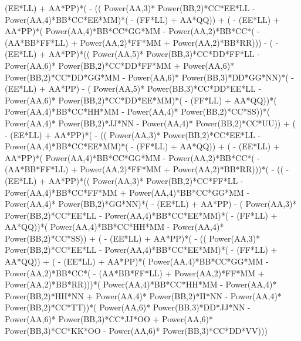 \documentclass[10pt]{article} %
\begin{document}
(EE*LL) + AA*PP)*( - (( Power(AA,3)* Power(BB,2)*CC*EE*LL -  Power(AA,4)*BB*CC*EE*MM)*( - (FF*LL) + AA*QQ)) + ( - (EE*LL) + AA*PP)*( Power(AA,4)*BB*CC*GG*MM -  Power(AA,2)*BB*CC*( - (AA*BB*FF*LL) +  Power(AA,2)*FF*MM +  Power(AA,2)*BB*RR))) - ( - (EE*LL) + AA*PP)*(( Power(AA,5)* Power(BB,3)*CC*DD*FF*LL -  Power(AA,6)* Power(BB,2)*CC*DD*FF*MM +  Power(AA,6)* Power(BB,2)*CC*DD*GG*MM -  Power(AA,6)* Power(BB,3)*DD*GG*NN)*( - (EE*LL) + AA*PP) - ( Power(AA,5)* Power(BB,3)*CC*DD*EE*LL -  Power(AA,6)* Power(BB,2)*CC*DD*EE*MM)*( - (FF*LL) + AA*QQ))*( Power(AA,4)*BB*CC*HH*MM -  Power(AA,4)* Power(BB,2)*CC*SS))*( Power(AA,4)* Power(BB,2)*JJ*NN -  Power(AA,4)* Power(BB,2)*CC*UU)) + ( - (EE*LL) + AA*PP)*( - (( Power(AA,3)* Power(BB,2)*CC*EE*LL -  Power(AA,4)*BB*CC*EE*MM)*( - (FF*LL) + AA*QQ)) + ( - (EE*LL) + AA*PP)*( Power(AA,4)*BB*CC*GG*MM -  Power(AA,2)*BB*CC*( - (AA*BB*FF*LL) +  Power(AA,2)*FF*MM +  Power(AA,2)*BB*RR)))*( - (( - (EE*LL) + AA*PP)*(( Power(AA,3)* Power(BB,2)*CC*FF*LL -  Power(AA,4)*BB*CC*FF*MM +  Power(AA,4)*BB*CC*GG*MM -  Power(AA,4)* Power(BB,2)*GG*NN)*( - (EE*LL) + AA*PP) - ( Power(AA,3)* Power(BB,2)*CC*EE*LL -  Power(AA,4)*BB*CC*EE*MM)*( - (FF*LL) + AA*QQ))*( Power(AA,4)*BB*CC*HH*MM -  Power(AA,4)* Power(BB,2)*CC*SS)) + ( - (EE*LL) + AA*PP)*( - (( Power(AA,3)* Power(BB,2)*CC*EE*LL -  Power(AA,4)*BB*CC*EE*MM)*( - (FF*LL) + AA*QQ)) + ( - (EE*LL) + AA*PP)*( Power(AA,4)*BB*CC*GG*MM -  Power(AA,2)*BB*CC*( - (AA*BB*FF*LL) +  Power(AA,2)*FF*MM +  Power(AA,2)*BB*RR)))*( Power(AA,4)*BB*CC*HH*MM -  Power(AA,4)* Power(BB,2)*HH*NN +  Power(AA,4)* Power(BB,2)*II*NN -  Power(AA,4)* Power(BB,2)*CC*TT))*( Power(AA,6)* Power(BB,3)*DD*JJ*NN -  Power(AA,6)* Power(BB,3)*CC*JJ*OO +  Power(AA,6)* Power(BB,3)*CC*KK*OO -  Power(AA,6)* Power(BB,3)*CC*DD*VV)))
\end{document}
